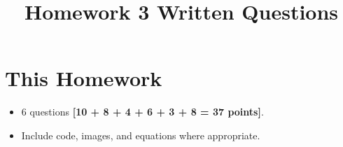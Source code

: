 \documentclass{csci1430}
\begin{document}
\title{Homework 3 Written Questions}
\maketitle
\thispagestyle{fancy}

\writeinstructions

\section*{This Homework}
\begin{itemize}
  \item 6 questions \textbf{[10 + 8 + 4 + 6 + 3 + 8 = 37 points]}.
  \item Include code, images, and equations where appropriate.
\end{itemize}

\pagebreak
\end{document}
